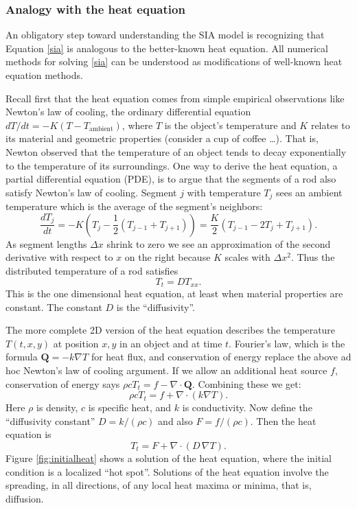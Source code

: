 \documentclass[titlepage,letterpaper,final,12pt]{scrartcl}
\newcommand{\grad}{\nabla}
\newcommand{\Div}{\nabla\cdot}
\begin{document}
\subsubsection*{Analogy with the heat equation}  An obligatory step toward understanding the SIA model is recognizing that Equation \eqref{sia} is analogous to the better-known heat equation.  All numerical methods for solving \eqref{sia} can be understood as modifications of well-known heat equation methods.

Recall first that the heat equation comes from simple empirical observations like Newton's law of cooling, the ordinary differential equation $dT/dt = -K (T-T_{\text{ambient}})$, 
where $T$ is the object's temperature and $K$ relates to its material and geometric properties (consider a cup of coffee \dots).  That is, Newton observed that the temperature of an object tends to decay exponentially to the temperature of its surroundings.  One way to derive the heat equation, a partial differential equation (PDE), is to argue that the segments of a rod also satisfy Newton's law of cooling.  Segment $j$ with temperature $T_j$ sees an ambient temperature which is the average of the segment's neighbors:
   $$\frac{dT_j}{dt} = -K \left(T_j - \frac{1}{2} (T_{j-1} + T_{j+1}) \right) = \frac{K}{2} \left(T_{j-1} - 2 T_j + T_{j+1}\right).$$
As segment lengths $\Delta x$ shrink to zero we see an approximation of the second derivative with respect to $x$ on the right because $K$ scales with $\Delta x^2$.  Thus the distributed temperature of a rod satisfies
\begin{equation}
  T_t = D T_{xx}. \label{heat1D}
\end{equation}
This is the one dimensional heat equation, at least when material properties are constant.  The constant $D$ is the ``diffusivity''.

The more complete 2D version of the heat equation describes the temperature $T(t,x,y)$ at position $x,y$ in an object and at time $t$.  Fourier's law, which is the formula $\mathbf{Q} = - k \grad T$ for heat flux, and conservation of energy replace the above ad hoc Newton's law of cooling argument.  If we allow an additional heat source $f$, conservation of energy says $\rho c T_t = f - \Div \mathbf{Q}$.  Combining these we get:
	$$\rho c T_t = f + \Div (k \grad T).$$
Here $\rho$ is density, $c$ is specific heat, and $k$ is conductivity.  Now define the ``diffusivity constant'' $D=k/(\rho c)$ and also $F = f/(\rho c)$.  Then the heat equation is
\begin{equation}
T_t = F + \Div (D\, \grad T). \label{heat}
\end{equation}
Figure \ref{fig:initialheat} shows a solution of the heat equation, where the initial condition is a localized ``hot spot''.  Solutions of the heat equation involve the spreading, in all directions, of any local heat maxima or minima, that is, diffusion.
\end{document}
